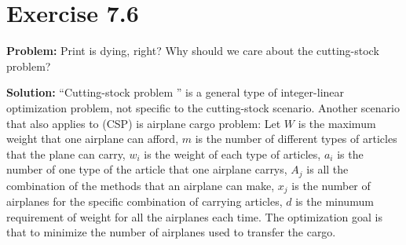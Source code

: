 \section{Exercise 7.6}
\textbf{Problem:} Print is dying, right? Why should we care about the cutting-stock problem?

\textbf{Solution:} ``Cutting-stock problem '' is a general type of integer-linear optimization problem, not specific to the cutting-stock scenario. Another scenario that also applies to (CSP) is airplane cargo problem: Let $W$ is the maximum weight that one airplane can afford, $m$ is the number of different types of articles that the plane can carry, $w_i$ is the weight of each type of articles, $a_i$ is the number of one type of the article that one airplane carrys, $A_j$ is all the combination of the methods that an airplane can make, $x_j$ is the number of airplanes for the specific combination of carrying articles, $d$ is the minumum requirement of weight for all the airplanes each time. The optimization goal is that to minimize the number of airplanes used to transfer the cargo.